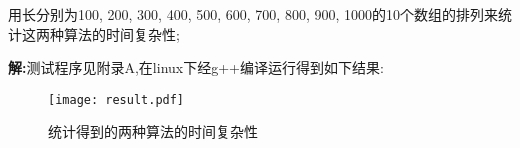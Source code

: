 \begin{problem}[习题3.2]
用长分别为100, 200, 300, 400, 500, 600, 700, 800, 900, 1000的10个数组的排列来统计这两种算法的时间复杂性;
\end{problem}
\begin{solution}
\textbf{解:}测试程序见附录A,在linux下经g++编译运行得到如下结果:

\begin{figure}[!htb]
\centering
\texttt{[image: result.pdf]}
\caption{统计得到的两种算法的时间复杂性}
\end{figure}
\end{solution}
